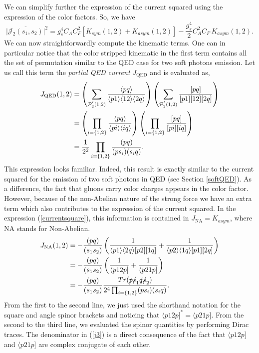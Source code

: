 We can simplify further the expression of the current squared using the expression of the color factors. So, we have 
\begin{equation}
\vert \overline{\mathcal{J}_2(s_1,s_2)} \vert^2= g^4_s C_AC^2_F \left[ K_{sym}(1,2)+K_{asym}(1,2) \right] -\frac{g^4_s}{2} C^2_A C_F \, K_{asym}(1,2).
\label{currentsquare}
\end{equation}
We can now straightforwardly compute the kinematic terms. One can in particular notice that the color stripped kinematic in the first term contains all the set of permutation similar to the QED case for two soft photons emission. Let us call this term the \emph{partial QED current} $J_{\text{QED}}$ and is evaluated as,
\begin{align}
J_{\text{QED}}(1,2) &= \left( \sum_{\mathcal{P}^{'}_2(1,2)} \frac{\langle pq\rangle}{\langle p1\rangle \langle12\rangle \langle2q\rangle} \right) \left( \sum_{\mathcal{P}^{'}_2(1,2)} \frac{[pq]}{[p1] [12] [2q]} \right) \\
&= \left( \prod_{i=\{1,2\}} \frac{\langle p q\rangle}{\langle p i\rangle \langle i q\rangle}  \right) \left( \prod_{i=\{1,2\}} \frac{[pq]}{[pi] [iq]}\right) \\
&= \frac{1}{2^2} \prod_{i=\{1,2\}} \frac{(p q)}{(p s_i) (s_i q)}.
\end{align}
This expression looks familiar. Indeed, this result is exactly similar to the current squared for the emission of two soft photons in QED (see Section \ref{softQED}). As a difference, the fact that gluons carry color charges appears in the color factor. However, because of the non-Abelian nature of the strong force we have an extra term which also contributes to the expression of the current squared. In the expression (\ref{currentsquare}), this information is contained in $J_{\text{NA}}=K_{asym}$, where NA stands for Non-Abelian. 
\begin{align}
J_{\text{NA}}(1,2) &=-\frac{(p q)}{(s_1s_2)} \left( \frac{1}{\langle p1\rangle \langle2q\rangle [p2] [1q]} + \frac{1}{\langle p2\rangle \langle1q\rangle [p1] [2q]}  \right) \\
&=-\frac{(p q)}{(s_1 s_2)} \left( \frac{1}{\langle p12p]} +\frac{1}{\langle p21p]}\right) \\
&=-\frac{(p q)}{(s_1 s_2)} \frac{Tr(\slashed{p} \slashed{s}_1 \slashed{q} \slashed{s}_2)}{2^4\prod_{i=\{1,2\}} (p s_i) (s_i q)}. \label{j3}
\end{align}
From the first to the second line, we just used the shorthand notation for the square and angle spinor brackets and noticing that $\langle p12p]^*=\langle p21p]$. From the second to the third line, we evaluated the spinor quantities by performing Dirac traces. The denominator in (\ref{j3}) is a direct consequence of the fact that $\langle p12p]$ and $\langle p21p]$ are complex conjugate of each other.

